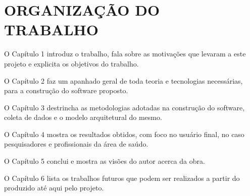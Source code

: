 \section[ORGANIZAÇÃO DO TRABALHO]{ORGANIZAÇÃO DO TRABALHO}

O Capítulo 1 introduz o trabalho, fala sobre as motivações que levaram a este projeto e explicita os objetivos do trabalho.

O Capítulo 2 faz um apanhado geral de toda teoria  e tecnologias necessárias, para a construção do software proposto.

O Capítulo 3 destrincha as metodologias adotadas na construção do software, coleta de dados e o modelo arquitetural do mesmo.

O Capítulo 4 mostra os resultados obtidos, com foco no usuário final, no caso pesquisadores e profissionais da área de saúdo.

O Capítulo 5 conclui e mostra as visões do autor acerca da obra.

O Capítulo 6 lista os trabalhos futuros que podem ser realizados a partir do produzido até aqui pelo projeto.
